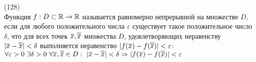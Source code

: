(128)\\
Функция $f: D \subset \mathbb{R} \to \mathbb{R}$ называется равномерно непрерывной на множестве $D$, если для любого положительного числа $\varepsilon$ существует такое положительное число $\delta$, что для всех точек $\overline{x}, \overline{\overline{x}}$ множества $D$, удовлетворяющих неравенству $|\overline{x} - \overline{\overline{x}}| < \delta$ выполняется неравенство $|f(\overline{x}) - f(\overline{\overline{x}})| < \varepsilon$:\\
$\forall \varepsilon > 0\ \exists \delta > 0\ \forall \overline{x}, \overline{\overline{x}} \in D:\ |\overline{x} - \overline{\overline{x}}| < \delta \Rightarrow |f(\overline{x}) - f(\overline{\overline{x}})| < \varepsilon$